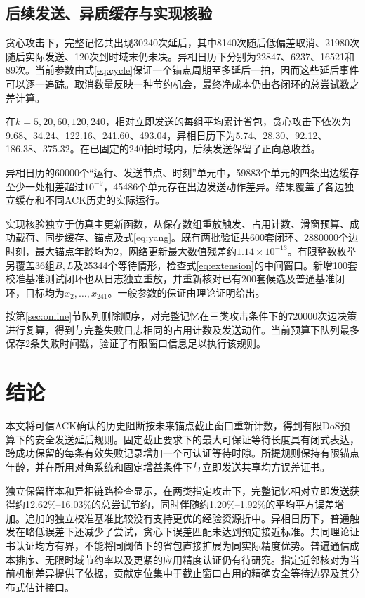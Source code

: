 \documentclass[UTF8,a4paper,zihao=5,fontset=windows]{ctexart}
\begin{document}
\subsection{后续发送、异质缓存与实现核验}
贪心攻击下，完整记忆共出现30240次延后，其中8140次随后低偏差取消、21980次随后实际发送、120次到时域末仍未决。异相日历下分别为22847、6237、16521和89次。当前参数由式\eqref{eq:cycle}保证一个锚点周期至多延后一拍，因而这些延后事件可以逐一追踪。取消数量反映一种节约机会，最终净成本仍由各闭环的总尝试数之差计算。

在$k=5,20,60,120,240$，相对立即发送的每组平均累计省包，贪心攻击下依次为9.68、34.24、122.16、241.60、493.04，异相日历下为5.74、28.30、92.12、186.38、375.32。在已固定的240拍时域内，后续发送保留了正向总收益。

异相日历的60000个“运行、发送节点、时刻”单元中，59883个单元的四条出边缓存至少一处相差超过$10^{-9}$，45486个单元存在出边发送动作差异。结果覆盖了各边独立缓存和不同ACK历史的实际运行。

实现核验独立于仿真主更新函数，从保存数组重放触发、占用计数、滑窗预算、成功载荷、同步缓存、锚点及式\eqref{eq:yang}。既有两批验证共600套闭环、2880000个边时刻，最大锚点年龄均为2，网络更新最大数值残差约$1.14\times10^{-13}$。有限整数枚举另覆盖36组$B,L$及25344个等待情形，检查式\eqref{eq:extension}的中间窗口。新增100套校准基准测试闭环也从日志独立重放，并重新核对已有200套候选及普通基准闭环，目标均为$x_2,\ldots,x_{241}$。一般参数的保证由理论证明给出。

按第\ref{sec:online}节队列删除顺序，对完整记忆在三类攻击条件下的720000次边决策进行复算，得到与完整失败日志相同的占用计数及发送动作。当前预算下队列最多保存2条失败时间戳，验证了有限窗口信息足以执行该规则。

\section{结论}
本文将可信ACK确认的历史阻断按未来锚点截止窗口重新计数，得到有限DoS预算下的安全发送延后规则。固定截止要求下的最大可保证等待长度具有闭式表达，跨成功保留的每条有效失败记录增加一个可认证等待时隙。所提规则保持有限锚点年龄，并在所用对角系统和固定增益条件下与立即发送共享均方误差证书。

独立保留样本和异相链路检查显示，在两类指定攻击下，完整记忆相对立即发送获得约12.62\%--16.03\%的总尝试节约，同时伴随约1.20\%--1.92\%的平均平方误差增加。追加的独立校准基准比较没有支持更优的经验资源折中。异相日历下，普通触发在略低误差下还减少了尝试，贪心下误差匹配未达到预定接近标准。共同理论证书认证均方有界，不能将同阈值下的省包直接扩展为同实际精度优势。普遍通信成本排序、无限时域节约率以及更紧的应用精度认证仍有待研究。指定近邻核对为当前机制差异提供了依据，贡献定位集中于截止窗口占用的精确安全等待边界及其分布式估计接口。
\end{document}
